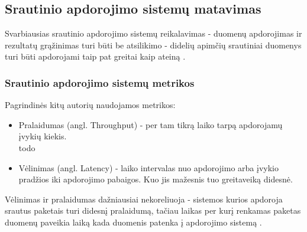 \documentclass{VUMIFPSbakalaurinis}
\begin{document}
\subsection{Srautinio apdorojimo sistemų matavimas}
Svarbiausias srautinio apdorojimo sistemų reikalavimas - duomenų apdorojimas ir rezultatų grąžinimas turi būti be atsilikimo - didelių apimčių srautiniai duomenys turi būti apdorojami taip pat greitai kaip ateiną \cite{stonebraker20058}. 

\subsubsection{Srautinio apdorojimo sistemų metrikos}
Pagrindinės kitų autorių naudojamos metrikos:
\begin{itemize}
    \item Pralaidumas (angl. Throughput) - per tam tikrą laiko tarpą apdorojamų įvykių kiekis. \\todo
    \item Vėlinimas (angl. Latency) - laiko intervalas nuo apdorojimo arba įvykio pradžios iki apdorojimo pabaigos. Kuo jis mažesnis tuo greitaveiką didesnė.
\end{itemize}
Vėlinimas ir pralaidumas dažniausiai nekoreliuoja - sistemos kurios apdoroja srautus paketais turi didesnį pralaidumą, tačiau laikas per kurį renkamas paketas duomenų paveikia laiką kada duomenis patenka į apdorojimo sistemą \cite{Karimov2018BenchmarkingDS}. \par
\end{document}
